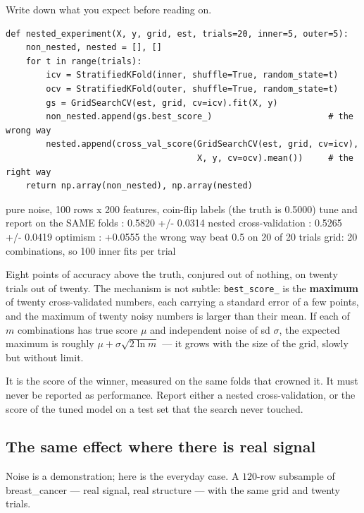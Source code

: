 \documentclass[11pt]{article}
\begin{document}
Write down what you expect before reading on.

\begin{lstlisting}
def nested_experiment(X, y, grid, est, trials=20, inner=5, outer=5):
    non_nested, nested = [], []
    for t in range(trials):
        icv = StratifiedKFold(inner, shuffle=True, random_state=t)
        ocv = StratifiedKFold(outer, shuffle=True, random_state=t)
        gs = GridSearchCV(est, grid, cv=icv).fit(X, y)
        non_nested.append(gs.best_score_)                       # the wrong way
        nested.append(cross_val_score(GridSearchCV(est, grid, cv=icv),
                                      X, y, cv=ocv).mean())     # the right way
    return np.array(non_nested), np.array(nested)
\end{lstlisting}
\begin{codeout}
pure noise, 100 rows x 200 features, coin-flip labels (the truth is 0.5000)
   tune and report on the SAME folds : 0.5820  +/- 0.0314
   nested cross-validation           : 0.5265  +/- 0.0419
   optimism                          : +0.0555
   the wrong way beat 0.5 on 20 of 20 trials
   grid: 20 combinations, so 100 inner fits per trial
\end{codeout}

Eight points of accuracy above the truth, conjured out of nothing, on twenty
trials out of twenty. The mechanism is not subtle: \texttt{best\_score\_} is
the \textbf{maximum} of twenty cross-validated numbers, each carrying a
standard error of a few points, and the maximum of twenty noisy numbers is
larger than their mean. If each of $m$ combinations has true score $\mu$ and
independent noise of sd $\sigma$, the expected maximum is roughly
$\mu + \sigma \sqrt{2 \ln m}$ --- it grows with the size of the grid, slowly
but without limit.

\begin{caution}
It is the score of the winner, measured on the same folds that crowned it. It
must never be reported as performance. Report either a nested
cross-validation, or the score of the tuned model on a test set that the
search never touched.
\end{caution}

\subsection{The same effect where there is real signal}

Noise is a demonstration; here is the everyday case. A $120$-row subsample of
breast\_cancer --- real signal, real structure --- with the same grid and
twenty trials.
\end{document}
